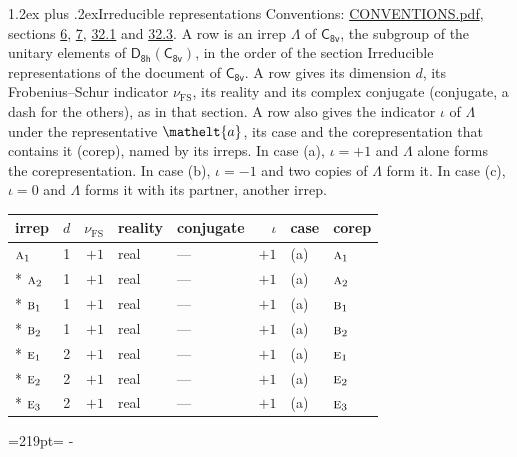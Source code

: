 \documentclass[10pt,a4paper]{article}
\makeatletter
\renewcommand\section{\@startsection{section}{1}{\z@}{-3ex plus -1ex minus -.2ex}%
  {1.2ex plus .2ex}{\normalfont\large\sffamily\bfseries\color{parttitle}}}
\newcommand{\needspace}[1]{\par\penalty-100\begingroup\dimen0=#1\relax\dimen2=\pagegoal
  \advance\dimen2-\pagetotal\ifdim\dimen0>\dimen2\relax\ifdim\dimen2>0pt\vfil\break\fi\fi
  \endgroup}
\numberwithin{equation}{section}
\newcommand{\eltfont}[1]{{\let\sigma\eltsigma\mathelt{#1}}}
\newcommand{\grp}[1]{\mathsf{#1}}
\newcommand{\irr}[1]{\text{\normalfont\scshape #1}}
\newcommand{\elt}[1]{\eltfont{#1}}
\newcommand{\fsind}{\nu_{\mathrm{FS}}}
\makeatother
\begin{document}
\section{Irreducible representations}\label{s:irreps}
Conventions: \href{../../CONVENTIONS.pdf}{CONVENTIONS.pdf}, sections \href{../../../rotation/CONVENTIONS.pdf\#conv.6}{6}, \href{../../../rotation/CONVENTIONS.pdf\#conv.7}{7}, \href{../../CONVENTIONS.pdf\#conv.32.1}{32.1} and \href{../../CONVENTIONS.pdf\#conv.32.3}{32.3}.
\leavevmode\label{n:irrep.Delta}A row is an irrep $\Lambda$ of $\grp{C_{8v}}$, the subgroup of the unitary elements of $\grp{D_{8h}}(\grp{C_{8v}})$, in the order of the section Irreducible representations of the document of \href{../../../rotation/data/pdf/C8v.pdf}{$\grp{C_{8v}}$}. \label{n:index.dimension}\label{n:index.frobenius}\label{n:head.irrep}\label{n:head.reality}\label{n:head.conjugate}A row gives its dimension $d$, its Frobenius--Schur indicator $\fsind$, its reality and its complex conjugate (conjugate, a dash for the others), as in that section. \label{n:head.case.corep}\label{n:head.corep}A row also gives the indicator $\iota$ of $\Lambda$ under the representative $\elt{a}$, its case and the corepresentation that contains it (corep), named by its irreps. In case (a), $\iota = +1$ and $\Lambda$ alone forms the corepresentation. In case (b), $\iota = -1$ and two copies of $\Lambda$ form it. In case (c), $\iota = 0$ and $\Lambda$ forms it with its partner, another irrep.
\setlength{\emergencystretch}{2em}\par\setlength{\emergencystretch}{0pt}
{\small\renewcommand{\arraystretch}{1.25}\setlength{\tabcolsep}{4pt}\begin{longtable}{@{}lrrllrll@{}}\toprule
irrep & $d$ & $\fsind$ & reality & conjugate & $\iota$ & case & corep\\\midrule\endhead
\bottomrule\endfoot\endlastfoot
$\irr{a}_{1}$ & 1 & $+1$ & real & --- & $+1$ & (a) & $\irr{a}_{1}$\\*
$\irr{a}_{2}$ & 1 & $+1$ & real & --- & $+1$ & (a) & $\irr{a}_{2}$\\*
$\irr{b}_{1}$ & 1 & $+1$ & real & --- & $+1$ & (a) & $\irr{b}_{1}$\\*
$\irr{b}_{2}$ & 1 & $+1$ & real & --- & $+1$ & (a) & $\irr{b}_{2}$\\*
$\irr{e}_{1}$ & 2 & $+1$ & real & --- & $+1$ & (a) & $\irr{e}_{1}$\\*
$\irr{e}_{2}$ & 2 & $+1$ & real & --- & $+1$ & (a) & $\irr{e}_{2}$\\*
$\irr{e}_{3}$ & 2 & $+1$ & real & --- & $+1$ & (a) & $\irr{e}_{3}$\\
\bottomrule\end{longtable}}
\needspace{219pt}
\end{document}
